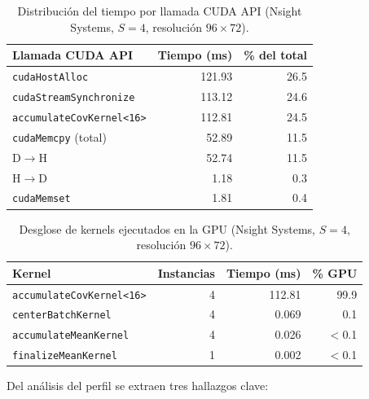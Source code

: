 \documentclass[12pt, a4paper]{article}
\begin{document}
\begin{table}[H]
    \centering
    \caption{Distribución del tiempo por llamada CUDA API (Nsight Systems,
             $S = 4$, resolución $96 \times 72$).}
    \label{tab:cuda_api}
    \begin{tabular}{@{} l r r @{}}
        \toprule
        \textbf{Llamada CUDA API} &
        \textbf{Tiempo (ms)} &
        \textbf{\% del total} \\
        \midrule
        \texttt{cudaHostAlloc}                   & 121.93  & 26.5  \\
        \texttt{cudaStreamSynchronize}           & 113.12  & 24.6  \\
        \texttt{accumulateCovKernel<16>}          & 112.81  & 24.5  \\
        \texttt{cudaMemcpy} (total)              &  52.89  & 11.5  \\
        \quad D$\to$H                            &  52.74  & 11.5  \\
        \quad H$\to$D                            &   1.18  &  0.3  \\
        \texttt{cudaMemset}                      &   1.81  &  0.4  \\
        \bottomrule
    \end{tabular}
\end{table}

\begin{table}[H]
    \centering
    \caption{Desglose de kernels ejecutados en la GPU (Nsight Systems,
             $S = 4$, resolución $96 \times 72$).}
    \label{tab:kernels_gpu}
    \begin{tabular}{@{} l r r r @{}}
        \toprule
        \textbf{Kernel} &
        \textbf{Instancias} &
        \textbf{Tiempo (ms)} &
        \textbf{\% GPU} \\
        \midrule
        \texttt{accumulateCovKernel<16>}  & 4 & 112.81  & 99.9  \\
        \texttt{centerBatchKernel}        & 4 &   0.069 &  0.1  \\
        \texttt{accumulateMeanKernel}     & 4 &   0.026 & $<$0.1 \\
        \texttt{finalizeMeanKernel}       & 1 &   0.002 & $<$0.1 \\
        \bottomrule
    \end{tabular}
\end{table}

Del análisis del perfil se extraen tres hallazgos clave:
\end{document}
